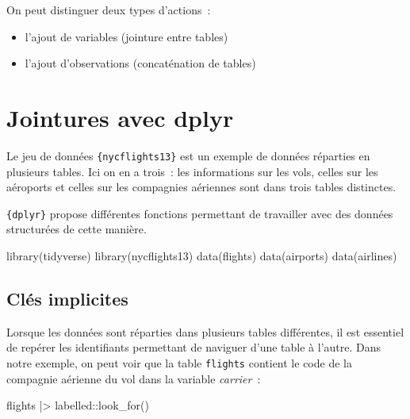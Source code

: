 \documentclass[
  letterpaper,
  DIV=11,
  numbers=noendperiod,
  oneside]{scrreprt}
\newenvironment{Shaded}{\begin{snugshade}}{\end{snugshade}}
\newcommand{\FunctionTok}[1]{\textcolor[rgb]{0.28,0.35,0.67}{#1}}
\newcommand{\NormalTok}[1]{\textcolor[rgb]{0.00,0.23,0.31}{#1}}
\newcommand{\SpecialCharTok}[1]{\textcolor[rgb]{0.37,0.37,0.37}{#1}}
\providecommand{\tightlist}{%
  \setlength{\itemsep}{0pt}\setlength{\parskip}{0pt}}\usepackage{longtable,booktabs,array}
\begin{document}
On peut distinguer deux types d'actions~:

\begin{itemize}
\tightlist
\item
  l'ajout de variables (jointure entre tables)
\item
  l'ajout d'observations (concaténation de tables)
\end{itemize}

\hypertarget{jointures-avec-dplyr}{%
\section{Jointures avec dplyr}\label{jointures-avec-dplyr}}

Le jeu de données \texttt{\{nycflights13\}} est un exemple de données
réparties en plusieurs tables. Ici on en a trois~: les informations sur
les vols, celles sur les aéroports et celles sur les compagnies
aériennes sont dans trois tables distinctes.

\texttt{\{dplyr\}} propose différentes fonctions permettant de
travailler avec des données structurées de cette manière.

\begin{Shaded}
\begin{Highlighting}[]
\FunctionTok{library}\NormalTok{(tidyverse)}
\FunctionTok{library}\NormalTok{(nycflights13)}
\FunctionTok{data}\NormalTok{(flights)}
\FunctionTok{data}\NormalTok{(airports)}
\FunctionTok{data}\NormalTok{(airlines)}
\end{Highlighting}
\end{Shaded}

\hypertarget{cluxe9s-implicites}{%
\subsection{Clés implicites}\label{cluxe9s-implicites}}

Lorsque les données sont réparties dans plusieurs tables différentes, il
est essentiel de repérer les identifiants permettant de naviguer d'une
table à l'autre. Dans notre exemple, on peut voir que la table
\texttt{flights} contient le code de la compagnie aérienne du vol dans
la variable \emph{carrier}~:

\begin{Shaded}
\begin{Highlighting}[]
\NormalTok{flights }\SpecialCharTok{|\textgreater{}}\NormalTok{ labelled}\SpecialCharTok{::}\FunctionTok{look\_for}\NormalTok{()}
\end{Highlighting}
\end{Shaded}
\end{document}
